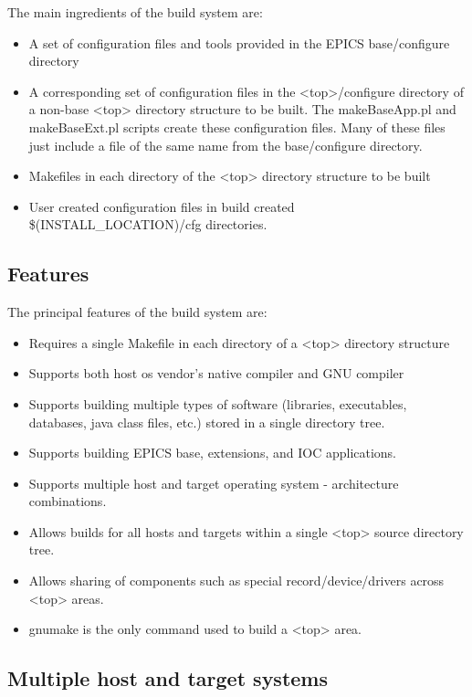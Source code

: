The main ingredients of the build system are:

\begin{itemize}\item A set of configuration files and tools provided in the EPICS base/configure directory

\item A corresponding set of configuration files in the \textless{}top\textgreater{}/configure directory of a non-base \textless{}top\textgreater{} directory structure 
to be built. The makeBaseApp.pl and makeBaseExt.pl scripts create these configuration files. Many of these files 
just include a file of the same name from the base/configure directory.

\item Makefiles in each directory of the \textless{}top\textgreater{} directory structure to be built

\item User created configuration files in build created \$(INSTALL\_LOCATION)/cfg directories.

\end{itemize}\subsection{Features}

The principal features of the build system are:

\begin{itemize}\item Requires a single Makefile in each directory of a \textless{}top\textgreater{} directory structure

\item Supports both host os vendor's native compiler and GNU compiler

\item Supports building multiple types of software (libraries, executables, databases, java class files, etc.) stored in a 
single directory tree.

\item Supports building EPICS base, extensions, and IOC applications.

\item Supports multiple host and target operating system - architecture combinations.

\item Allows builds for all hosts and targets within a single \textless{}top\textgreater{} source directory tree.

\item Allows sharing of components such as special record/device/drivers across \textless{}top\textgreater{} areas.

\item gnumake is the only command used to build a \textless{}top\textgreater{} area.

\end{itemize}\subsection{Multiple host and target systems}

